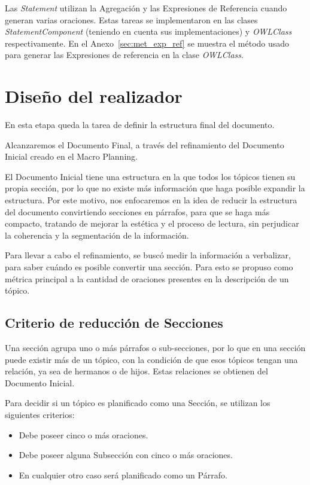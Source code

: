Las \emph{Statement} utilizan la Agregación y las Expresiones de Referencia cuando generan varias oraciones. Estas tareas se implementaron en las clases \emph{StatementComponent} (teniendo en cuenta sus implementaciones) y \emph{OWLClass} respectivamente. En el Anexo~\ref{sec:met_exp_ref} se muestra el método usado para generar las Expresiones de referencia en la clase \emph{OWLClass}.


\section{Diseño del realizador}
En esta etapa queda la tarea de definir la estructura final del documento. 

Alcanzaremos el Documento Final, a través del refinamiento del Documento Inicial creado en el Macro Planning.

El Documento Inicial tiene una estructura en la que todos los tópicos tienen su propia sección, por lo que no existe más información que haga posible expandir la estructura. Por este motivo, nos enfocaremos en la idea de reducir la estructura del documento convirtiendo secciones en párrafos, para que se haga más compacto, tratando de mejorar la estética y el proceso de lectura, sin perjudicar la coherencia y la segmentación de la información.

Para llevar a cabo el refinamiento, se buscó medir la información a verbalizar, para saber cuándo es posible convertir una sección. Para esto se propuso como métrica principal a la cantidad de oraciones presentes en la descripción de un tópico.

\subsection{Criterio de reducción de Secciones}
Una sección agrupa uno o más párrafos o sub-secciones, por lo que en una sección puede existir más de un tópico, con la condición de que esos tópicos tengan una relación, ya sea de hermanos o de hijos. Estas relaciones se obtienen del Documento Inicial. 

Para decidir si un tópico es planificado como una Sección, se utilizan los siguientes criterios:
\begin{itemize}
    \item Debe poseer cinco o más oraciones.
    \item Debe poseer alguna Subsección con cinco o más oraciones.
    \item En cualquier otro caso será planificado como un Párrafo.
\end{itemize}

